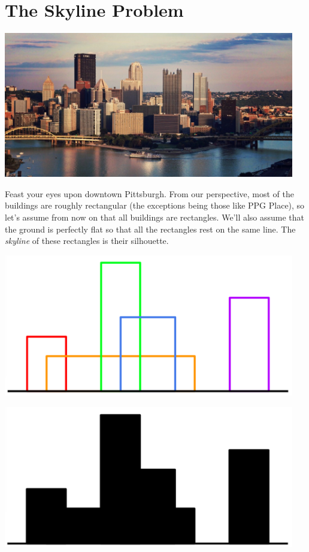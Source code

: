 \section{The Skyline Problem}
\begin{gram}

\begin{center}
  \includegraphics[width=5in]{./skyline/media/pittsburgh.png}
\end{center}

Feast your eyes upon downtown Pittsburgh. From our perspective, most
of the buildings are roughly rectangular (the exceptions being those like PPG
Place), so let's assume from now on that all buildings are rectangles. We'll
also assume that the ground is perfectly flat so that all the rectangles rest
on the same line. The \emph{skyline} of these rectangles is their
silhouette.


\begin{center}
  \includegraphics[width=5in]{./skyline/media/buildings.png}

  \includegraphics[width=5in]{./skyline/media/silhouette.png}

\end{center}
\end{gram}

